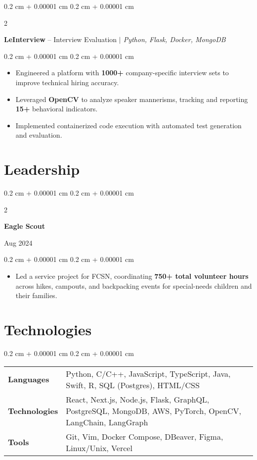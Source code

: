 \documentclass[10pt, letterpaper]{article}
\newenvironment{highlights}{
    \begin{itemize}[
        topsep=0.10 cm,
        parsep=0.10 cm,
        partopsep=0pt,
        itemsep=0pt,
        leftmargin=0.4 cm + 10pt
    ]
}{
    \end{itemize}
} %
\newenvironment{onecolentry}{
    \begin{adjustwidth}{
        0.2 cm + 0.00001 cm
    }{
        0.2 cm + 0.00001 cm
    }
}{
    \end{adjustwidth}
} %
\newenvironment{twocolentry}[2][]{
    \onecolentry
    \def\secondColumn{#2}
    \setcolumnwidth{\fill, 5 cm}
    \begin{paracol}{2}
}{
    \switchcolumn \raggedleft \secondColumn
    \end{paracol}
    \endonecolentry
} %
\let\hrefWithoutArrow\href
\renewcommand{\href}[2]{\hrefWithoutArrow{#1}{\ifthenelse{\equal{#2}{}}{ }{#2 }\raisebox{.15ex}{\footnotesize \faExternalLink*}}}
\begin{document}
        \vspace{0.3 cm}

        \begin{twocolentry}{}
            \textbf{LeInterview} -- Interview Evaluation \textit{ $|$ Python, Flask, Docker, MongoDB}
        \end{twocolentry}

        \vspace{0.10 cm}
        \begin{onecolentry}
            \begin{highlights}
                \item Engineered a platform with \textbf{1000+} company-specific interview sets to improve technical hiring accuracy.
                \item Leveraged \textbf{OpenCV} to analyze speaker mannerisms, tracking and reporting \textbf{15+} behavioral indicators.
                \item Implemented containerized code execution with automated test generation and evaluation.
            \end{highlights}
        \end{onecolentry}


    \section{Leadership}

        \begin{twocolentry}{
        Aug 2024}
            \textbf{Eagle Scout}
        \end{twocolentry}

        \vspace{0.10 cm}
        \begin{onecolentry}
            \begin{highlights}
                \item Led a service project for FCSN, coordinating \textbf{750+ total volunteer hours} across hikes, campouts, and backpacking events for special-needs children and their families.
            \end{highlights}
        \end{onecolentry}


    \section{Technologies}
    
        \begin{onecolentry}
            \begin{tabularx}{\textwidth}{@{}p{2.15cm}Y@{}}
                \textbf{Languages} & Python, C/C++, JavaScript, TypeScript, Java, Swift, R, SQL (Postgres), HTML/CSS \\[0.1cm]
                \textbf{Technologies} & React, Next.js, Node.js, Flask, GraphQL, PostgreSQL, MongoDB, AWS, PyTorch, OpenCV, LangChain, LangGraph \\[0.5cm]
                \textbf{Tools} & Git, Vim, Docker Compose, DBeaver, Figma, Linux/Unix, Vercel
            \end{tabularx}
        \end{onecolentry}
\end{document}
